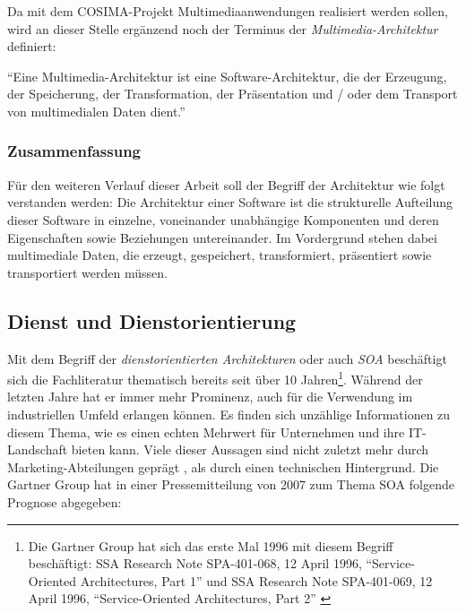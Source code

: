   Da mit dem COSIMA-Projekt Multimediaanwendungen realisiert werden sollen, wird an dieser Stelle ergänzend noch der Terminus der \emph{Multimedia-Architektur} definiert:
  
  \begin{definition}\label{def:multimedia_architektur}
    "`Eine Multimedia-Architektur ist eine Software-Architektur, die der Erzeugung, der Speicherung, der Transformation, der Präsentation und / oder dem Transport von multimedialen Daten dient."' \emph{\citep[S. 423]{handbuch_der_software_architektur}}
  \end{definition}


\subsubsection{Zusammenfassung} %
\label{ssub:zusammenfassung}

  Für den weiteren Verlauf dieser Arbeit soll der Begriff der Architektur wie folgt verstanden werden: Die Architektur einer Software ist die strukturelle Aufteilung dieser Software in einzelne, voneinander unabhängige Komponenten und deren Eigenschaften sowie Beziehungen untereinander. Im Vordergrund stehen dabei multimediale Daten, die erzeugt, gespeichert, transformiert, präsentiert sowie transportiert werden müssen.



\subsection{Dienst und Dienstorientierung} %
\label{sub:definition_dienst_und_dienstorientierung}

  Mit dem Begriff der \emph{dienstorientierten Architekturen} oder auch \emph{SOA} beschäftigt sich die Fachliteratur thematisch bereits seit über 10 Jahren\footnote{Die Gartner Group hat sich das erste Mal 1996 mit diesem Begriff beschäftigt: SSA Research Note SPA-401-068, 12 April 1996, "`Service-Oriented Architectures, Part 1"' und SSA Research Note SPA-401-069, 12 April 1996, "`Service-Oriented Architectures, Part 2"' \citep{natis2003soa}}. Während der letzten Jahre hat er immer mehr Prominenz, auch für die Verwendung im industriellen Umfeld erlangen können. Es finden sich unzählige Informationen zu diesem Thema, wie es einen echten Mehrwert für Unternehmen und ihre IT-Landschaft bieten kann. Viele dieser Aussagen sind nicht zuletzt mehr durch Marketing-Abteilungen geprägt \citep{soa_goes_real}, als durch einen technischen Hintergrund. Die Gartner Group hat in einer Pressemitteilung von 2007 zum Thema SOA folgende Prognose abgegeben:
  
